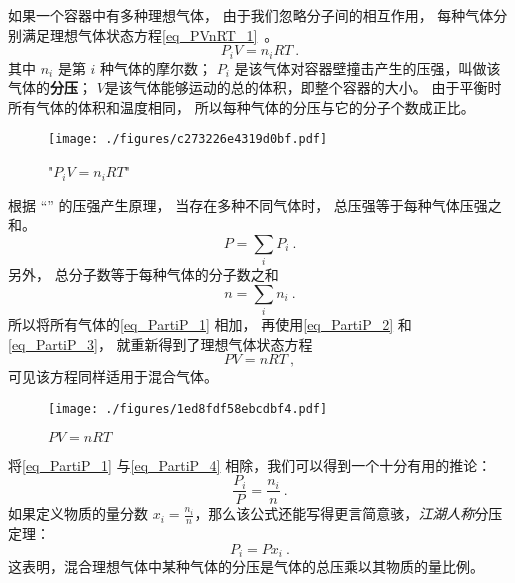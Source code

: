 

如果一个容器中有多种理想气体， 由于我们忽略分子间的相互作用， 每种气体分别满足理想气体状态方程\autoref{eq_PVnRT_1}~。
\begin{equation}\label{eq_PartiP_1}
P_i V = n_i R T~.
\end{equation}
其中 $n_i$ 是第 $i$ 种气体的摩尔数； $P_i$ 是该气体对容器壁撞击产生的压强，叫做该气体的\textbf{分压}； $V$是该气体能够运动的总的体积，即整个容器的大小。 由于平衡时所有气体的体积和温度相同， 所以每种气体的分压与它的分子个数成正比。
\begin{figure}[ht]
\centering
\texttt{[image: ./figures/c273226e4319d0bf.pdf]}
\caption{"$P_i V = n_i R T$"} \label{fig_PartiP_4}
\end{figure}

根据 “” 的压强产生原理， 当存在多种不同气体时， 总压强等于每种气体压强之和。
\begin{equation}\label{eq_PartiP_2}
P = \sum_i P_i~.
\end{equation}
另外， 总分子数等于每种气体的分子数之和
\begin{equation}\label{eq_PartiP_3}
n = \sum_i n_i~.
\end{equation}
所以将所有气体的\autoref{eq_PartiP_1} 相加， 再使用\autoref{eq_PartiP_2} 和\autoref{eq_PartiP_3}， 就重新得到了理想气体状态方程
\begin{equation}\label{eq_PartiP_4}
P V = n RT~,
\end{equation}
可见该方程同样适用于混合气体。

\begin{figure}[ht]
\centering
\texttt{[image: ./figures/1ed8fdf58ebcdbf4.pdf]}
\caption{$P V = n RT$} \label{fig_PartiP_3}
\end{figure}

将\autoref{eq_PartiP_1} 与\autoref{eq_PartiP_4}  相除，我们可以得到一个十分有用的推论：
\begin{equation}
\frac{P_i}{P} = \frac{n_i}{n} ~.
\end{equation}
如果定义物质的量分数 $x_i = \frac{n_i}{n}$，那么该公式还能写得更言简意骇，\textsl{江湖人称}分压定理：
\begin{equation}
P_i = P x_i ~.
\end{equation}
这表明，混合理想气体中某种气体的分压是气体的总压乘以其物质的量比例。
